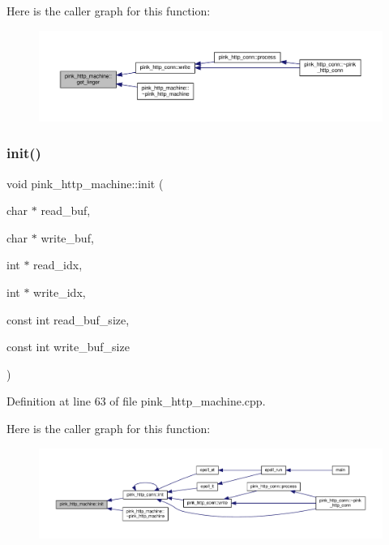 Here is the caller graph for this function\+:\nopagebreak
\begin{figure}[H]
\begin{center}
\leavevmode
\includegraphics[width=350pt]{classpink__http__machine_a01dcf59a537c21d5a4a92c1c25fbf3ab_icgraph}
\end{center}
\end{figure}
\mbox{\label{classpink__http__machine_a32b0ee47de1b90467d17194fa83b4eb0}} 
\subsubsection{\texorpdfstring{init()}{init()}}
{\footnotesize\ttfamily void pink\+\_\+http\+\_\+machine\+::init (\begin{DoxyParamCaption}\item[{char $\ast$}]{read\+\_\+buf,  }\item[{char $\ast$}]{write\+\_\+buf,  }\item[{int $\ast$}]{read\+\_\+idx,  }\item[{int $\ast$}]{write\+\_\+idx,  }\item[{const int}]{read\+\_\+buf\+\_\+size,  }\item[{const int}]{write\+\_\+buf\+\_\+size }\end{DoxyParamCaption})}



Definition at line 63 of file pink\+\_\+http\+\_\+machine.\+cpp.

Here is the caller graph for this function\+:\nopagebreak
\begin{figure}[H]
\begin{center}
\leavevmode
\includegraphics[width=350pt]{classpink__http__machine_a32b0ee47de1b90467d17194fa83b4eb0_icgraph}
\end{center}
\end{figure}
\mbox{\label{classpink__http__machine_ad6d404392628f4b2c94a4b30fefb62f8}} 
